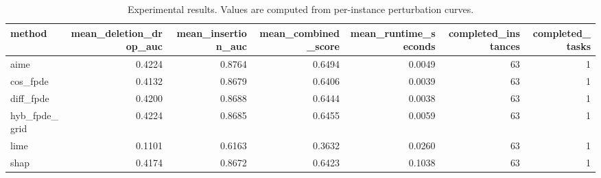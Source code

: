 \begin{table}[t]
\caption{Experimental results. Values are computed from per-instance perturbation curves.}
\label{tab:main_results_computed}
\centering
\begin{tabular}{lrrrrrr}
\toprule
method & mean\_deletion\_drop\_auc & mean\_insertion\_auc & mean\_combined\_score & mean\_runtime\_seconds & completed\_instances & completed\_tasks \\
\midrule
aime & 0.4224 & 0.8764 & 0.6494 & 0.0049 & 63 & 1 \\
cos\_fpde & 0.4132 & 0.8679 & 0.6406 & 0.0039 & 63 & 1 \\
diff\_fpde & 0.4200 & 0.8688 & 0.6444 & 0.0038 & 63 & 1 \\
hyb\_fpde\_grid & 0.4224 & 0.8685 & 0.6455 & 0.0059 & 63 & 1 \\
lime & 0.1101 & 0.6163 & 0.3632 & 0.0260 & 63 & 1 \\
shap & 0.4174 & 0.8672 & 0.6423 & 0.1038 & 63 & 1 \\
\bottomrule
\end{tabular}

\end{table}
